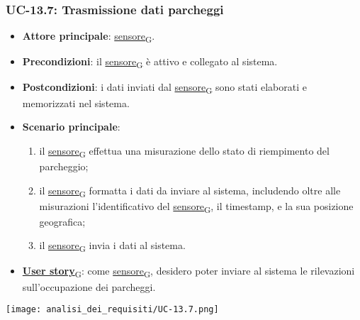 \newpage

\subsubsection{UC-13.7: Trasmissione dati parcheggi}
\begin{itemize}
	\item \textbf{Attore principale}: \href{https://7last.github.io/docs/rtb/documentazione-interna/glossario\#sensore}{sensore\textsubscript{G}}.
	\item \textbf{Precondizioni}: il \href{https://7last.github.io/docs/rtb/documentazione-interna/glossario\#sensore}{sensore\textsubscript{G}} è attivo e collegato al sistema.
	\item \textbf{Postcondizioni}: i dati inviati dal \href{https://7last.github.io/docs/rtb/documentazione-interna/glossario\#sensore}{sensore\textsubscript{G}} sono stati elaborati e memorizzati nel sistema.
	\item \textbf{Scenario principale}:
	      \begin{enumerate}
		      \item il \href{https://7last.github.io/docs/rtb/documentazione-interna/glossario\#sensore}{sensore\textsubscript{G}} effettua una misurazione dello stato di riempimento del parcheggio;
		      \item il \href{https://7last.github.io/docs/rtb/documentazione-interna/glossario\#sensore}{sensore\textsubscript{G}} formatta i dati da inviare al sistema, includendo oltre alle misurazioni l'identificativo del \href{https://7last.github.io/docs/rtb/documentazione-interna/glossario\#sensore}{sensore\textsubscript{G}},
		            il timestamp, e la sua posizione geografica;
		      \item il \href{https://7last.github.io/docs/rtb/documentazione-interna/glossario\#sensore}{sensore\textsubscript{G}} invia i dati al sistema.
	      \end{enumerate}
	\item \href{https://7last.github.io/docs/rtb/documentazione-interna/glossario\#user-story}{\textbf{User story}\textsubscript{G}}: come \href{https://7last.github.io/docs/rtb/documentazione-interna/glossario\#sensore}{sensore\textsubscript{G}}, desidero poter inviare al sistema le rilevazioni sull'occupazione dei parcheggi.
\end{itemize}

\begin{center}
	\texttt{[image: analisi\_dei\_requisiti/UC-13.7.png]}
\end{center}


